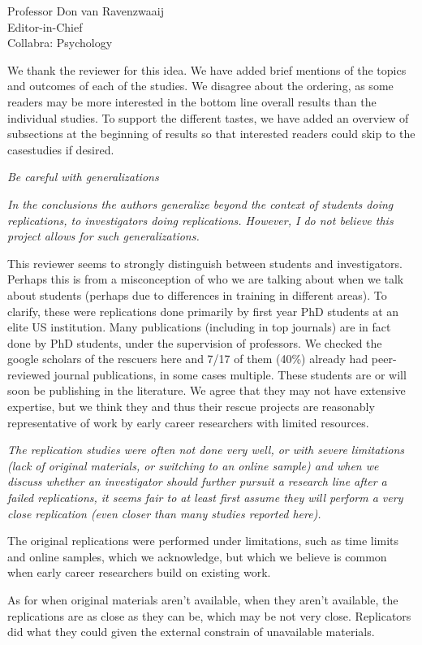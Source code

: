 \documentclass{stanfordletter}
\newcommand{\theysaid}[1]{\begin{leftbar} \noindent 
		\textsl{ #1}\end{leftbar}}
\begin{document}
\begin{letter}{Professor Don van Ravenzwaaij \\ Editor-in-Chief \\ Collabra: Psychology }
		 
		 We thank the reviewer for this idea. We have added brief mentions of the topics and outcomes of each of the studies. We disagree about the ordering, as some readers may be more interested in the bottom line overall results than the individual studies. To support the different tastes, we have added an overview of subsections at the beginning of results so that interested readers could skip to the casestudies if desired. 
		 
		
		\theysaid{Be careful with generalizations}
		\theysaid{In the conclusions the authors generalize beyond the context of students doing replications, to investigators doing replications. However, I do not believe this project allows for such generalizations.} 
		
		This reviewer seems to strongly distinguish between students and investigators. Perhaps this is from a misconception of who we are talking about when we talk about students (perhaps due to differences in training in different areas). To clarify, these were replications done primarily by first year PhD students at an elite US institution. Many publications (including in top journals) are in fact done by PhD students, under the supervision of professors. We checked the google scholars of the rescuers here and 7/17 of them (40\%) already had peer-reviewed journal publications, in some cases multiple. These students are or will soon be publishing in the literature. We agree that they may not have extensive expertise, but we think they and thus their rescue projects are reasonably representative of work by early career researchers with limited resources. 
		
		\theysaid{The replication studies were often not done very well, or with severe limitations (lack of original materials, or switching to an online sample) and when we discuss whether an investigator should further pursuit a research line after a failed replications, it seems fair to at least first assume they will perform a very close replication (even closer than many studies reported here).}
		
		The original replications were performed under limitations, such as time limits and online samples, which we acknowledge, but which we believe is common when early career researchers build on existing work. 
		
		As for when original materials aren't available, when they aren't available, the replications are as close as they can be, which may be not very close. Replicators did what they could given the external constrain of unavailable materials. 
		

\end{letter}
\end{document}

